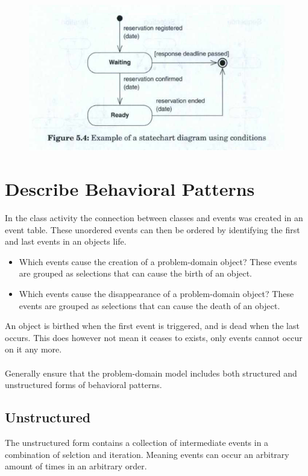 \begin{figure}[H]
    \centering
    \includegraphics[width=\linewidth]{chapters/behavior/figures/condtion_statechart.png}
\end{figure}

\section{Describe Behavioral Patterns \ooad[98]}
In the class activity the connection between classes and events was created in an event table. These unordered events can then be ordered by identifying the first and last events in an objects life.
\begin{itemize}
    \item Which events cause the creation of a problem-domain object? These events are grouped as selections that can cause the birth of an object.
    \item Which events cause the disappearance of a problem-domain object? These events are grouped as selections that can cause the death of an object.
\end{itemize}
An object is birthed when the first event is triggered, and is dead when the last occurs. This does however not mean it ceases to exists, only events cannot occur on it any more.
\\\\
Generally ensure that the problem-domain model includes both structured and unstructured forms of behavioral patterns.

\subsection*{Unstructured}
The unstructured form contains a collection of intermediate events in a combination of selction and iteration. Meaning events can occur an arbitrary amount of times in an arbitrary order.

